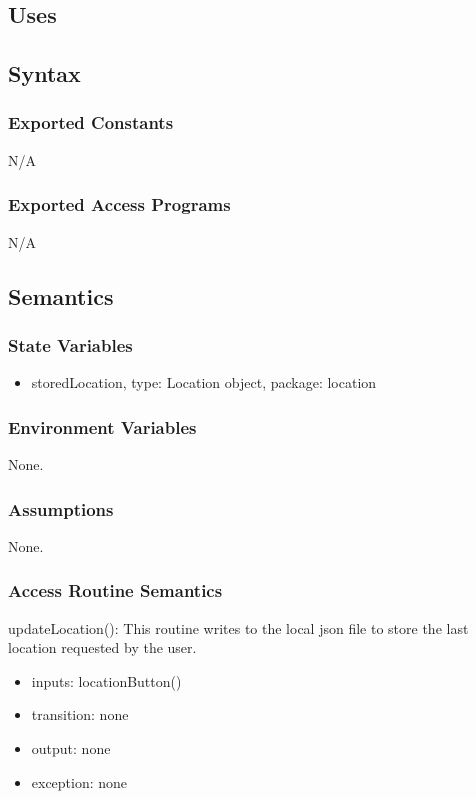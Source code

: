 \documentclass[12pt, titlepage]{article}
\begin{document}
\subsection{Uses}


\subsection{Syntax}

\subsubsection{Exported Constants}

N/A

\subsubsection{Exported Access Programs}

N/A

\subsection{Semantics}

\subsubsection{State Variables}

\begin{itemize}
\item storedLocation, type: Location object, package: location
\end{itemize}


\subsubsection{Environment Variables}

None.


\subsubsection{Assumptions}

None.

\subsubsection{Access Routine Semantics}

\noindent updateLocation():
This routine writes to the local json file to store the last location requested by the user.
\begin{itemize}
\item inputs: locationButton()
\item transition: none
\item output: none
\item exception: none
\end{itemize}
\end{document}
